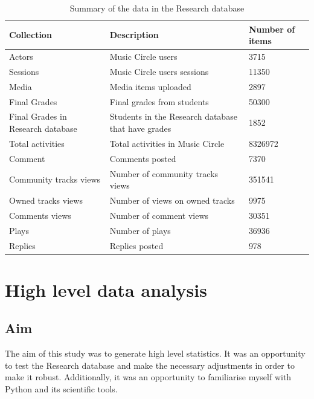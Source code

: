 \documentclass[11pt, oneside]{article}   	%
\begin{document}
\begin{table}[h!]
	\centering
	\begin{tabularx}{\linewidth}{|X|X|X|}
		\hline
		 \textbf{Collection} & \textbf{Description} & \textbf{Number of items} \\ \hline
		 Actors & Music Circle users & 3715 \\ \hline
		 Sessions & Music Circle users sessions & 11350 \\ \hline
		 Media & Media items uploaded & 2897 \\ \hline
		 Final Grades & Final grades from students & 50300\\ \hline
		 Final Grades in Research database & Students in the Research database that have grades & 1852\\ \hline
		 Total activities & Total activities in Music Circle & 8326972 \\ \hline
		 Comment & Comments posted & 7370\\ \hline
		 Community tracks views & Number of community tracks views & 351541 \\ \hline
		 Owned tracks views & Number of views on owned tracks & 9975 \\ \hline
		 Comments views & Number of comment views & 30351 \\ \hline
		 Plays & Number of plays & 36936 \\ \hline
		 Replies & Replies posted & 978 \\ \hline
	\end{tabularx}
	\caption{Summary of the data in the Research database}
	\label{table:researchDatabase}
\end{table}

\section{High level data analysis}
\label{section:statisticsStudy}
\subsection{Aim}
The aim of this study was to generate high level statistics. It was an opportunity to test the Research database and make the necessary adjustments in order to make it robust. Additionally, it was an opportunity to familiarise myself with Python and its scientific tools.
\end{document}
